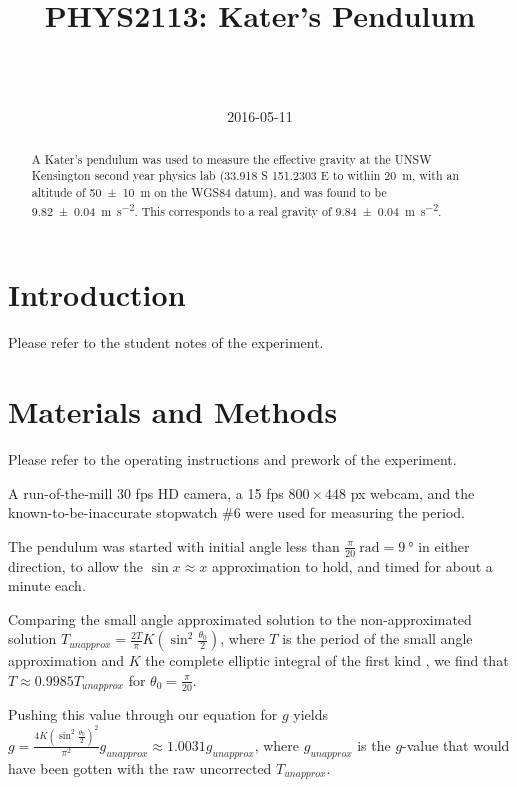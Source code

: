 \documentclass[a4paper]{scrartcl}
\begin{document}
\title{PHYS2113: Kater's Pendulum}
\author{ \\ \\}
\date{2016-05-11}
\maketitle

\begin{abstract}
    A Kater's pendulum was used to measure the effective gravity at the UNSW Kensington second year physics lab (33.918 S 151.2303 E to within \SI{20}{\metre}, with an altitude of \SI{50 \pm 10}{\metre} on the WGS84 datum), and was found to be \SI{9.82 \pm 0.04}{\metre\per\second\squared}. This corresponds to a real gravity of \SI{9.84 \pm 0.04}{\metre\per\second\squared}.
\end{abstract}

\section{Introduction}
Please refer to the student notes of the experiment.

\section{Materials and Methods}
Please refer to the operating instructions and prework of the experiment.

A run-of-the-mill 30 fps HD camera, a 15 fps \(800 \times 448\) px webcam, and the known-to-be-inaccurate stopwatch \#6 were used for measuring the period.

The pendulum was started with initial angle less than \(\frac{\pi}{20} \:\si{\radian} = \SI{9}{\degree}\) in either direction, to allow the \(\sin x \approx x\) approximation to hold, and timed for about a minute each.

Comparing the small angle approximated solution to the non-approximated solution \(T_{unapprox} = \frac{2 T}{\pi} K(\sin^2 \frac{\theta_0}{2})\), where \(T\) is the period of the small angle approximation and \(K\) the complete elliptic integral of the first kind \cite{wiki:pendulum}, we find that \(T \approx 0.9985 T_{unapprox}\) for \(\theta_0 = \frac{\pi}{20}\).

Pushing this value through our equation for \(g\) yields \(g = \frac{4 K(\sin^2 \frac{\theta_0}{2})^2}{\pi^2} g_{unapprox} \approx 1.0031 g_{unapprox}\), where \(g_{unapprox}\) is the \(g\)-value that would have been gotten with the raw uncorrected \(T_{unapprox}\).
\end{document}
